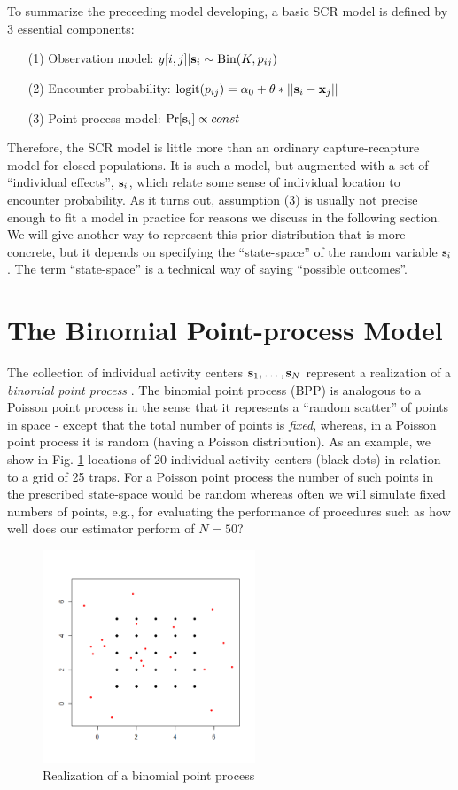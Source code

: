 To summarize the preceeding model developing, a basic SCR model is
defined by 3 essential components:
\begin{itemize}
\item[(1)] Observation model: $y[i,j]|{\bf s}_{i} \sim \mbox{Bin}(K, p_{ij})$
\item[(2)] Encounter probability: $\mbox{logit}(p_{ij}) = \alpha_{0} +
  \theta*||{\bf s}_{i}-{\bf x}_{j}||$
\item[(3)] Point process model: $\Pr[{\bf s}_{i} ] \propto const$	
\end{itemize}			
Therefore, the SCR model is little more than an ordinary
capture-recapture model for closed populations. It is such a model,
but augmented with a set of ``individual effects'', ${\bf s}_{i}$,
which relate some sense of individual location to encounter
probability.  As it turns out, assumption (3) is usually not precise
enough to fit a model in practice for reasons we discuss in the
following section.  We will give another way to represent this prior
distribution that is more concrete, but it depends on specifying the
``state-space'' of the random variable ${\bf s}_{i}$. The term
``state-space'' is a technical way of saying ``possible outcomes''.


\section{ The Binomial Point-process Model}
The collection of individual activity centers ${\bf s}_{1},\ldots,
{\bf s}_{N}$
represent a realization of a {\it binomial point process} 
\citep[][p. xyz]{illian_etal:2008}.  The binomial point process (BPP)
is analogous to a Poisson point process in the sense that it
represents a ``random scatter'' of points in space - except that the
total number of points is {\it fixed}, whereas, in a Poisson point
process it is random (having a Poisson distribution).  As an example,
we show in Fig. \ref{scr0.fig.bpp} 
locations of 20 individual activity centers
(black dots) in relation to a grid of 25 traps. For a Poisson point
process the number of such points in the prescribed state-space would
be random whereas often we will simulate fixed numbers of points,
e.g., for evaluating the performance of procedures such as how well
does our estimator perform of $N=50$? \begin{figure}
\begin{center}
\includegraphics[height=2.5in]{figs/binomialpoint}
\end{center}
\caption{Realization of a binomial point process}
\label{scr0.fig.bpp}
\end{figure}

